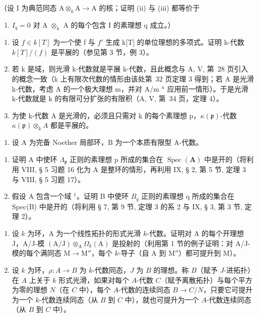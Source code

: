（设 I 为典范同态 \(\mathrm{A} \otimes_k \mathrm{A} \to \mathrm{A}\) 的核；证明 (ii) 与 (iii) 都等价于

\begin{enumerate}
\def\labelenumi{(\roman{enumi})}
\setcounter{enumi}{3}
\tightlist
\item
  \(I_{q} = 0\) 对 A \(\otimes_{k}\) A 的每个包含 I 的素理想 q 成立。）
\end{enumerate}

\begin{enumerate}
\def\labelenumi{\alph{enumi})}
\setcounter{enumi}{1}
\item
  设 \(f \in k[T]\) 为一个使 f 与 \(f'\) 生成 k{[}T{]} 的单位理想的多项式。证明 k-代数 \(k[T]/(f)\) 是平展的（参见第 3 节，例 3）。
\item
  若 k 是域，则光滑 k-代数就是平展 k-代数，且此概念与 A, V, 第~28 页引入的概念一致（k 上有限次代数的情形由该处第~32 页定理 3 得到；若 A 是光滑 k-代数，考虑 A 的一个极大理想 m，并对 A/m \(^{n}\) 应用前一情形）。于是光滑 k-代数就是 k 的有限可分扩张的有限积（A, V, 第~34 页，定理 4）。
\item
  为使 k-代数 A 是光滑的，必须且只需对 k 的每个素理想 p，\(\kappa(\mathfrak{p})\)-代数 \(\kappa(\mathfrak{p})\otimes_{k}A\) 都是平展的。
\end{enumerate}

\begin{enumerate}
\def\labelenumi{\arabic{enumi})}
\setcounter{enumi}{4}
\tightlist
\item
  设 A 为完备 Noether 局部环，B 为一个本质有限型 A-代数。
\end{enumerate}

\begin{enumerate}
\def\labelenumi{\alph{enumi})}
\item
  证明 A 中使环 \(\Lambda_{\mathfrak{p}}\) 正则的素理想 p 所成的集合在 \(\operatorname{Spec}(\mathbf{A})\) 中是开的（将利用 VIII, § 5 习题 16 化为 A 是整环的情形，再利用 IX, § 2, 第 5 节, 定理 3 与 VIII, § 5 习题 17）。
\item
  假设 A 包含一个域 \(^{1}\)。证明 B 中使环 \(B_{q}\) 正则的素理想 q 所成的集合在 Spec(B) 中是开的（将利用 § 7, 第 9 节, 定理 3 的系 2 与 IX, § 3, 第 3 节, 定理 2）。
\end{enumerate}

\begin{enumerate}
\def\labelenumi{\arabic{enumi})}
\setcounter{enumi}{5}
\item
  设 \(k\) 为环，A 为一个线性拓扑的形式光滑 \(k\)-代数。证明对 A 的每个开理想 J，A/J-模 \((\mathrm{A} / \mathrm{J}) \otimes_{\mathrm{A}} \Omega_k(\mathrm{A})\) 是投射的（利用第 1 节的例子证明：对 A/J-模的每个满同态 \(\mathrm{M} \to \mathrm{M}''\)，每个 \(k\)-导子（自 A 到 \(\mathrm{M}''\)）都可提升到 M）。
\item
  设 \(k\) 为环，\(\rho : A \to B\) 为 \(k\)-代数同态，\(J\) 为 \(B\) 的理想。称 \(B\)（赋予 \(J\)-进拓扑）在 \(A\) 上关于 \(k\) 形式光滑，如果对每个 \(A\)-代数 \(C\)（赋予离散拓扑）与每个平方为零的理想 \(N\)（在 \(C\) 中），每个 \(A\)-代数的连续同态 \(B \to C/N\)，只要它可提升为一个 \(k\)-代数连续同态（从 \(B\) 到 \(C\) 中），就也可提升为一个 \(A\)-代数连续同态（从 \(B\) 到 \(C\) 中）。
\end{enumerate}

